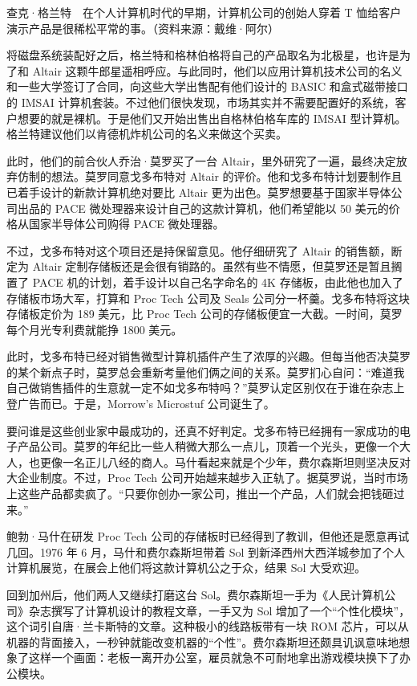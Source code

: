 \documentclass[12pt,UTF8]{ctexbook}
\begin{document}
查克·格兰特　在个人计算机时代的早期，计算机公司的创始人穿着 T 恤给客户演示产品是很稀松平常的事。（资料来源：戴维·阿尔）

将磁盘系统装配好之后，格兰特和格林伯格将自己的产品取名为北极星，也许是为了和 Altair 这颗牛郎星遥相呼应。与此同时，他们以应用计算机技术公司的名义和一些大学签订了合同，向这些大学出售配有他们设计的 BASIC 和盒式磁带接口的 IMSAI 计算机套装。不过他们很快发现，市场其实并不需要配置好的系统，客户想要的就是裸机。于是他们又开始出售出自格林伯格车库的 IMSAI 型计算机。格兰特建议他们以肯德机炸机公司的名义来做这个买卖。

此时，他们的前合伙人乔治·莫罗买了一台 Altair，里外研究了一遍，最终决定放弃仿制的想法。莫罗同意戈多布特对 Altair 的评价。他和戈多布特计划要制作且已着手设计的新款计算机绝对要比 Altair 更为出色。莫罗想要基于国家半导体公司出品的 PACE 微处理器来设计自己的这款计算机，他们希望能以 50 美元的价格从国家半导体公司购得 PACE 微处理器。

不过，戈多布特对这个项目还是持保留意见。他仔细研究了 Altair 的销售额，断定为 Altair 定制存储板还是会很有销路的。虽然有些不情愿，但莫罗还是暂且搁置了 PACE 机的计划，着手设计以自己名字命名的 4K 存储板，由此他也加入了存储板市场大军，打算和 Proc Tech 公司及 Seals 公司分一杯羹。戈多布特将这块存储板定价为 189 美元，比 Proc Tech 公司的存储板便宜一大截。一时间，莫罗每个月光专利费就能挣 1800 美元。

此时，戈多布特已经对销售微型计算机插件产生了浓厚的兴趣。但每当他否决莫罗的某个新点子时，莫罗总会重新考量他们俩之间的关系。莫罗扪心自问：“难道我自己做销售插件的生意就一定不如戈多布特吗？”莫罗认定区别仅在于谁在杂志上登广告而已。于是，Morrow's Microstuf 公司诞生了。

要问谁是这些创业家中最成功的，还真不好判定。戈多布特已经拥有一家成功的电子产品公司。莫罗的年纪比一些人稍微大那么一点儿，顶着一个光头，更像一个大人，也更像一名正儿八经的商人。马什看起来就是个少年，费尔森斯坦则坚决反对大企业制度。不过，Proc Tech 公司开始越来越步入正轨了。据莫罗说，当时市场上这些产品都卖疯了。“只要你创办一家公司，推出一个产品，人们就会把钱砸过来。”

鲍勃·马什在研发 Proc Tech 公司的存储板时已经得到了教训，但他还是愿意再试几回。1976 年 6 月，马什和费尔森斯坦带着 Sol 到新泽西州大西洋城参加了个人计算机展览，在展会上他们将这款计算机公之于众，结果 Sol 大受欢迎。

回到加州后，他们两人又继续打磨这台 Sol。费尔森斯坦一手为《人民计算机公司》杂志撰写了计算机设计的教程文章，一手又为 Sol 增加了一个“个性化模块”，这个词引自唐·兰卡斯特的文章。这种极小的线路板带有一块 ROM 芯片，可以从机器的背面接入，一秒钟就能改变机器的“个性”。费尔森斯坦还颇具讥讽意味地想象了这样一个画面：老板一离开办公室，雇员就急不可耐地拿出游戏模块换下了办公模块。
\end{document}
